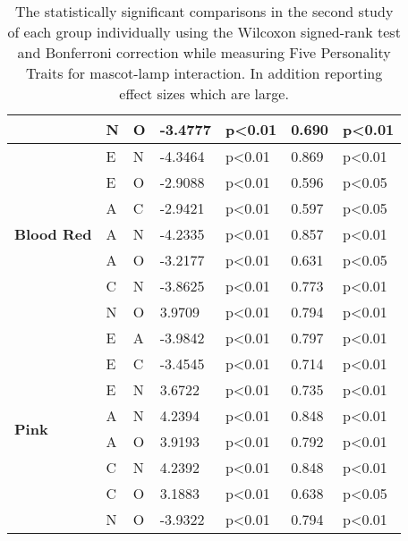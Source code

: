 \begin{table}
\begin{center}
\begin{tabular}{ |p{1.9cm}| p{0.5cm}|p{0.5cm}|p{1.2cm}| p{1.9cm}|p{1cm}|p{1.5cm}|  }
            &N &O &-3.4777 &p<0.01 &0.690 &p<0.01\\
            \hline
            \hline
            \multirow{7}{*}{\textbf{Blood Red}}
            &E &N &-4.3464 &p<0.01 &0.869 &p<0.01\\
            &E &O &-2.9088 &p<0.01 &0.596 &p<0.05\\
            &A &C &-2.9421 &p<0.01 &0.597 &p<0.05\\
            &A &N &-4.2335 &p<0.01 &0.857 &p<0.01\\
            &A &O &-3.2177 &p<0.01 &0.631 &p<0.05\\
            &C &N &-3.8625 &p<0.01 &0.773 &p<0.01\\
            &N &O &3.9709 &p<0.01 &0.794 &p<0.01\\
            \hline
            \hline
            \multirow{8}{*}{\textbf{Pink}}
            &E &A &-3.9842 &p<0.01 &0.797 &p<0.01\\
            &E &C &-3.4545 &p<0.01 &0.714 &p<0.01\\
            &E &N &3.6722 &p<0.01 &0.735 &p<0.01\\
            &A &N &4.2394 &p<0.01 &0.848 &p<0.01\\
            &A &O &3.9193 &p<0.01 &0.792 &p<0.01\\
            &C &N &4.2392 &p<0.01 &0.848 &p<0.01\\
            &C &O &3.1883 &p<0.01 &0.638 &p<0.05\\
            &N &O &-3.9322 &p<0.01 &0.794 &p<0.01\\
            \hline
        \end{tabular}
    \end{center}
    \captionsetup{width=13.5cm}
    \caption{The statistically significant comparisons in the second study of each group individually using the Wilcoxon signed-rank
    test and Bonferroni correction while measuring Five Personality Traits for mascot-lamp interaction.
    In addition reporting effect sizes which are large.}
    \label{table:wilcoxML2}
\end{table}
\pagebreak
